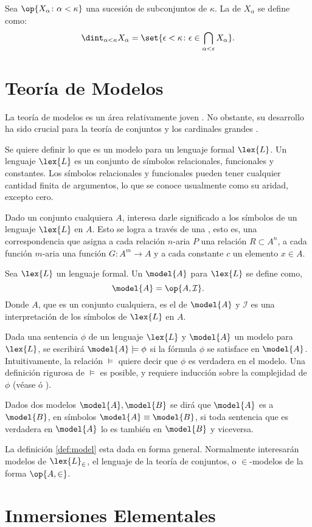 Sea $\op{X_\alpha\colon \alpha<\kappa}$ una sucesión
de subconjuntos de $\kappa$. La  de
$X_\alpha$ se define como:
\[
    \dint_{\alpha<\kappa}X_\alpha
    =
    \set{\epsilon<\kappa\colon\epsilon\in \bigcap_{\alpha<\epsilon}X_\alpha} .
\]

\section{Teoría de Modelos}
\label{sec:models}

La teoría de modelos es un área relativamente joven \autocite[pág. 3]{chang_model_2012}.
No obstante, su desarrollo ha sido crucial para la teoría de conjuntos y los
cardinales grandes \autocite[pág. xv]{kanamori_higher_2009}.

Se quiere definir lo que es un modelo para un lenguaje formal $\lex{L}$.
Un lenguaje $\lex{L}$ es un conjunto de símbolos relacionales, funcionales y constantes.
Los símbolos relacionales y funcionales pueden tener cualquier cantidad finita de argumentos,
lo que se conoce usualmente como su aridad, excepto cero.

Dado un conjunto cualquiera $A$, interesa darle significado a los símbolos de un
lenguaje $\lex{L}$ en $A$. Esto se logra a través de una , esto es,
una correspondencia que asigna a cada relación $n$-aria $P$ una relación
$R\subset A^n$, a cada función $m$-aria una función $G\colon A^m\to A$ y a cada
constante $c$ un elemento $x\in A$.

\begin{defi}\label{def:model}
    Sea $\lex{L}$ un lenguaje formal. Un  $\model{A}$ para $\lex{L}$ se define como,
    \[
        \model{A} = \op{A, \mathcal{I}}.
    \]
    Donde $A$, que es un conjunto cualquiera, es el  de $\model{A}$ y
    $\mathcal{I}$ es una interpretación de los símbolos de $\lex{L}$ en $A$.
\end{defi}

Dada una sentencia $\phi$ de un lenguaje $\lex{L}$ y $\model{A}$ un modelo para $\lex{L}$,
se escribirá $\model{A}\models\phi$ si la fórmula $\phi$ se satisface en $\model{A}$.
Intuitivamente, la relación $\models$ quiere decir que $\phi$ es verdadera en el modelo.
Una definición rigurosa de $\models$ es posible, y requiere inducción sobre la complejidad
de $\phi$ (véase \autocite[\S 1.3]{chang_model_2012} ó \autocite[\S 12]{jech_set_2003}).

Dados dos modelos $\model{A}, \model{B}$ se dirá que $\model{A}$ es  a $\model{B}$, en símbolos $\model{A}\equiv \model{B}$, si toda sentencia
que es verdadera en $\model{A}$ lo es también en $\model{B}$ y viceversa.

La definición \ref{def:model} esta dada en forma general. Normalmente interesarán modelos de $\lex{L}_\in$,
el lenguaje de la teoría de conjuntos, o $\in$-modelos de la forma $\op{A,\in}$.

\section{Inmersiones Elementales}
\label{sec:elem-embed}
